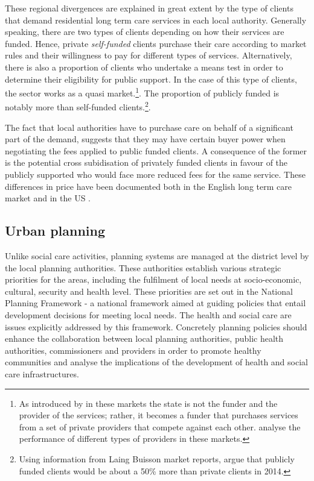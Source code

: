 \documentclass[12pt,letterpaper]{article}
\begin{document}
  These regional divergences are explained in great extent by the type of clients that demand 
  residential long term care services in each local authority. Generally speaking, 
  there are two types of clients depending on how their services are funded. Hence, 
 private \textit{self-funded} clients purchase their care 
 according to market rules and their willingness to pay for different types of 
 services. Alternatively, there is also a proportion of clients who 
 undertake a means test in order to determine 
 their eligibility for public support. In the case of this type of clients, the sector works as a quasi 
 market.\footnote{As introduced by \citet{legrand1991quasi} in these markets the 
 state is not the funder and the provider of the services; rather, it becomes 
 a funder that purchases services from a set of private providers that compete 
 against each other. \citet{barron2017quasi} analyse the performance of different types of providers in these 
 markets.}. The proportion of publicly funded is notably more than self-funded clients.\footnote{Using information
  from Laing Buisson market reports, \citet{jarret2017} argue that publicly 
  funded clients would be about a 50\% more than private  clients in 2014.}.

The fact that local authorities have to purchase care on behalf of a significant 
part of the demand, suggests that they may have certain buyer power when negotiating 
the fees applied to public funded clients. A consequence of the former is the 
potential cross subidisation of privately funded clients in favour of the publicly 
supported who would face more reduced fees for the same service. These differences in price 
have
been documented both in the English long term care market \citep{oft2005, hancock2010, forder2014} 
and in the US \citep{mukamel2002competitive, grabowski2004longitudinal}. 


\subsection{Urban planning}

Unlike social care activities, planning systems are managed at the district level by the local planning authorities. 
 These authorities establish various strategic priorities for the areas, including the fulfilment of 
 local needs at socio-economic, 
  cultural, security and health level. These priorities are set out in the National Planning Framework - a national
  framework aimed at guiding policies that entail development decisions for meeting local needs. 
    The health and social care are issues explicitly addressed by this framework. Concretely planning policies should enhance the collaboration between local planning authorities, 
     public health authorities, commissioners and providers in order to promote healthy communities 
     and analyse the implications of the development of health and social care infrastructures. 
     
\end{document}
